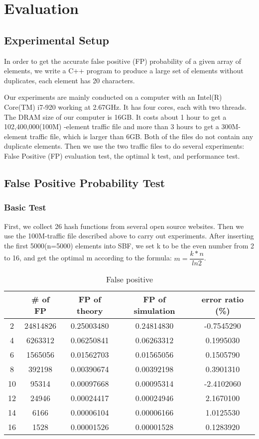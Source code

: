 \section{Evaluation}
\label{sec:evaluation}

\subsection{Experimental Setup}
In order to get the accurate false positive (FP) probability of a given array of elements, we write a C++ program to produce a large set of elements without duplicates, each element has 20 characters.   

 
Our experiments are mainly conducted on a computer with an Intel(R) Core(TM) i7-920 working at 2.67GHz. It has four cores, each with two threads. The DRAM size of our computer is 16GB. It costs about 1 hour to get a 102,400,000(100M) -element traffic file and more than 3 hours to get a 300M-element traffic file, which is larger than 6GB. Both of the files do not contain any duplicate elements. 
Then we use the two traffic files to do several experiments: False Positive (FP) evaluation test, the optimal k test, and performance test.


\subsection{False Positive Probability Test}

\subsubsection{Basic Test}

First, we collect 26 hash functions from several open source websites. Then we use the 100M-traffic file described above to carry out experiments. After inserting the first 5000(n=5000) elements into SBF,  we set k to be the even number from 2 to 16, and get the optimal m according to the formula: $m=\dfrac{k*n}{ln2}$.



\begin{table}[htbp]
\centering\caption{False positive}
\begin{tabular}{c c c c c}
\hline
	&	\# of FP	&	FP of theory	&	FP of simulation	&	error ratio	(\%)\\
\hline
2	&	24814826	&	0.25003480 	&	0.24814830 	&	-0.7545290 	\\
4	&	6263312	&	0.06250841 	&	0.06263312 	&	0.1995030 	\\
6	&	1565056	&	0.01562703 	&	0.01565056 	&	0.1505790 	\\
8	&	392198	&	0.00390674 	&	0.00392198 	&	0.3901310 	\\
10	&	95314	&	0.00097668 	&	0.00095314 	&	-2.4102060 	\\
12	&	24946	&	0.00024417 	&	0.00024946 	&	2.1670100 	\\
14	&	6166	&	0.00006104 	&	0.00006166 	&	1.0125530 	\\
16	&	1528	&	0.00001526 	&	0.00001528 	&	0.1283920 	\\
\hline
\end{tabular}
\label{table:fp:theory:sim}
\end{table}


